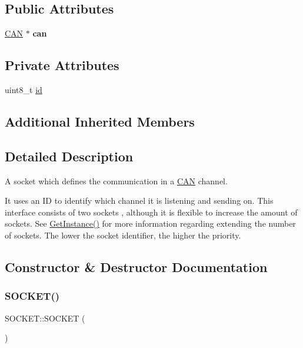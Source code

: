\subsection*{Public Attributes}
\begin{DoxyCompactItemize}
\item 
\hypertarget{class_s_o_c_k_e_t_a40e1973f231f6e5c51f02bfb8e7c0722}{}\label{class_s_o_c_k_e_t_a40e1973f231f6e5c51f02bfb8e7c0722} 
\hyperlink{class_c_a_n}{C\+AN} $\ast$ {\bfseries can}
\end{DoxyCompactItemize}
\subsection*{Private Attributes}
\begin{DoxyCompactItemize}
\item 
uint8\+\_\+t \hyperlink{class_s_o_c_k_e_t_a0755fe74751c2d94d3d1679cad9e6544}{id}
\end{DoxyCompactItemize}
\subsection*{Additional Inherited Members}


\subsection{Detailed Description}
A socket which defines the communication in a \hyperlink{class_c_a_n}{C\+AN} channel. 

It uses an ID to identify which channel it is listening and sending on. This interface consists of two sockets , although it is flexible to increase the amount of sockets. See \hyperlink{class_s_o_c_k_e_t_acd81e49443c51d84f7bfe5d616d1b750}{Get\+Instance()} for more information regarding extending the number of sockets. The lower the socket identifier, the higher the priority. 

\subsection{Constructor \& Destructor Documentation}
\hypertarget{class_s_o_c_k_e_t_a354625580716401ca8444fd01b99e89e}{}\label{class_s_o_c_k_e_t_a354625580716401ca8444fd01b99e89e} 
\subsubsection{\texorpdfstring{S\+O\+C\+K\+E\+T()}{SOCKET()}\hspace{0.1cm}{\footnotesize\ttfamily [1/2]}}
{\footnotesize\ttfamily S\+O\+C\+K\+E\+T\+::\+S\+O\+C\+K\+ET (\begin{DoxyParamCaption}\item[{const \hyperlink{class_s_o_c_k_e_t}{S\+O\+C\+K\+ET} \&}]{ }\end{DoxyParamCaption})\hspace{0.3cm}{\ttfamily [delete]}}

